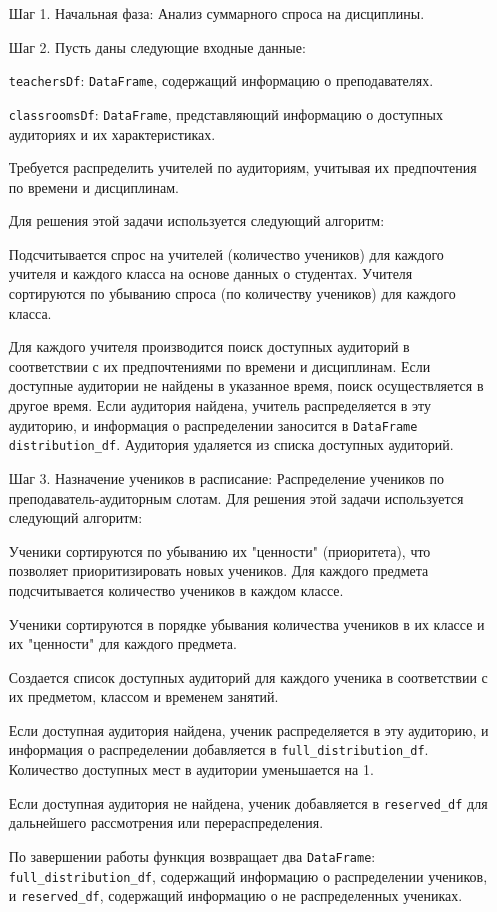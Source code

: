 \begin{itemize}
    \item[Шаг 1.]  Начальная фаза: Анализ суммарного спроса на дисциплины.
    \item[Шаг 2.] Пусть даны следующие входные данные:
    
    \verb$teachersDf$: \verb$DataFrame$, содержащий информацию о преподавателях.
    
    \verb$classroomsDf$: \verb$DataFrame$, представляющий информацию о доступных аудиториях и их характеристиках.
    
Требуется распределить учителей по аудиториям, учитывая их предпочтения по времени и дисциплинам.

Для решения этой задачи используется следующий алгоритм:

Подсчитывается спрос на учителей (количество учеников) для каждого учителя и каждого класса на основе данных о студентах.
Учителя сортируются по убыванию спроса (по количеству учеников) для каждого класса.

Для каждого учителя производится поиск доступных аудиторий в соответствии с их предпочтениями по времени и дисциплинам. Если доступные аудитории не найдены в указанное время, поиск осуществляется в другое время.
Если аудитория найдена, учитель распределяется в эту аудиторию, и информация о распределении заносится в \verb$DataFrame$ \verb$distribution_df$. Аудитория удаляется из списка доступных аудиторий.

    \item[Шаг 3.] Назначение учеников в расписание: Распределение учеников по преподаватель-аудиторным слотам. 
    Для решения этой задачи используется следующий алгоритм:
    
Ученики сортируются по убыванию их "ценности" (приоритета), что позволяет приоритизировать новых учеников.
Для каждого предмета подсчитывается количество учеников в каждом классе.

Ученики сортируются в порядке убывания количества учеников в их классе и их "ценности" для каждого предмета.

Создается список доступных аудиторий для каждого ученика в соответствии с их предметом, классом и временем занятий.

Если доступная аудитория найдена, ученик распределяется в эту аудиторию, и информация о распределении добавляется в \verb$full_distribution_df$. Количество доступных мест в аудитории уменьшается на 1.

Если доступная аудитория не найдена, ученик добавляется в \verb$reserved_df$ для дальнейшего рассмотрения или перераспределения.

По завершении работы функция возвращает два \verb$DataFrame$:
 \verb$full_distribution_df$, содержащий информацию о распределении учеников, и \verb$reserved_df$, содержащий информацию о не распределенных учениках.
\end{itemize}

